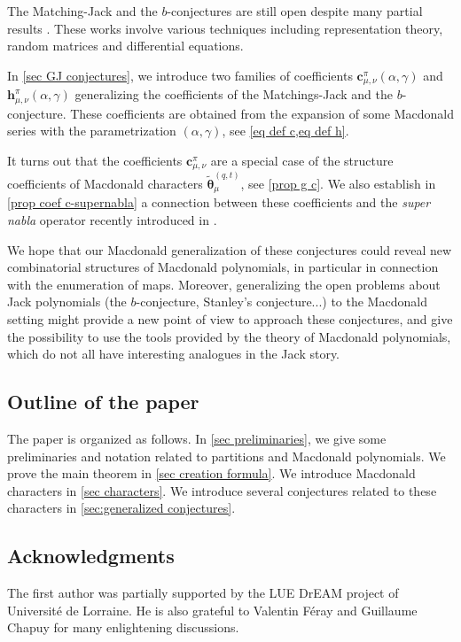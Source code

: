\documentclass[12pt]{amsart}
\theoremstyle{remark}
\newcommand{\bfc}{\boldsymbol{c}}
\newcommand{\bfh}{\boldsymbol{h}}
\newcommand{\Mch}{\boldsymbol{\widetilde\theta}^{(q,t)}}
\begin{document}
The Matching-Jack and the $b$-conjectures are still open despite many partial results \cite{DolegaFeray2016,DolegaFeray2017,ChapuyDolega2022,BenDali2022a,BenDali2023}. These works involve various techniques including representation theory, random matrices and differential equations.

In \cref{sec GJ conjectures}, we introduce two families of coefficients $\bfc^\pi_{\mu,\nu}(\alpha,\gamma)$ and $\bfh^\pi_{\mu,\nu}(\alpha,\gamma)$ generalizing the coefficients of the Matchings-Jack and the $b$-conjecture. These coefficients are obtained from the expansion of some Macdonald series with the parametrization $(\alpha,\gamma)$, see \cref{eq def c,eq def h}.  

It turns out that the coefficients $\bfc^\pi_{\mu,\nu}$ are a special case of the structure coefficients of Macdonald characters $\Mch_\mu$, see \cref{prop g c}.
We also establish in \cref{prop coef c-supernabla} a connection between these coefficients and the \emph{super nabla} operator recently introduced in \cite{BergeronHaglundIraciRomero2023}.

We hope that our Macdonald generalization of these conjectures could reveal new combinatorial structures of Macdonald polynomials, in particular in connection with the enumeration of maps. Moreover, generalizing the open problems  about Jack polynomials (the $b$-conjecture, Stanley's conjecture...) to the Macdonald setting might provide a new point of view to approach these conjectures, and give the possibility to use the tools provided by the theory of Macdonald polynomials, which do not
all have interesting analogues in the Jack story.

\subsection{Outline of the paper}
The paper is organized as follows. In \cref{sec preliminaries}, we give some preliminaries and notation related to partitions and Macdonald polynomials. We prove the main theorem in \cref{sec creation formula}. We introduce Macdonald characters in \cref{sec characters}. We introduce several conjectures related to these characters in \cref{sec:generalized conjectures}. 

\subsection{Acknowledgments}

The first author was partially supported by the LUE DrEAM project of Université de Lorraine. He is also grateful to Valentin Féray and Guillaume Chapuy for many enlightening discussions.
\end{document}
